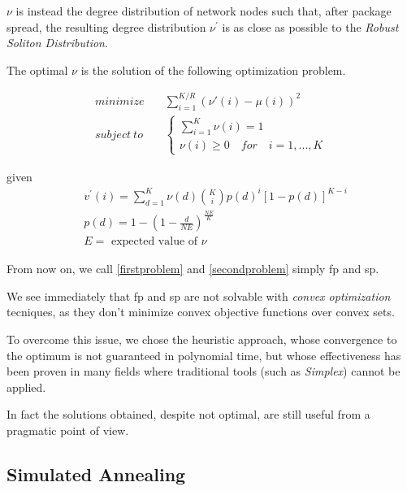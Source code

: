 \documentclass[12pt,journal,draftclsnofoot,onecolumn]{IEEEtran}
\begin{document}
$\nu$ is instead the degree distribution of network nodes such that, after package spread, the resulting degree distribution $\nu^\prime$ is as close as possible to the \emph{Robust Soliton Distribution}.

The optimal $\nu$ is the solution of the following optimization problem\cite{Lin2007}.

\begin{equation}
	\label{secondproblem}
	\begin{split}
		minimize & \quad \sum_{i=1}^{K/R}(\nu'(i)-\mu(i))^2 \\
		subject \ to & \quad \begin{cases}
			\sum_{i=1}^K \nu(i) = 1 \\
			\nu(i) \geq 0 \quad for \quad i=1,...,K
		\end{cases}
	\end{split}
\end{equation}

given
\begin{equation*}
	\begin{split}
		& v^\prime(i) = \sum_{d=1}^K \nu(d) \binom{K}{i} p(d)^i [1-p(d)]^{K-i} \\
		& p(d) = 1 - \left(1 -\frac{d}{N E}\right)^{\frac{N E}{K}} \\
		& E = \text{ expected value of }\nu
	\end{split}
\end{equation*}

From now on, we call \eqref{firstproblem} and \eqref{secondproblem} simply \gls{fp} and \gls{sp}.

We see immediately that \gls{fp} and \gls{sp} are not solvable with \emph{convex optimization} tecniques, as they don't minimize convex objective functions over convex sets.

To overcome this issue, we chose the heuristic approach, whose convergence to the optimum is not guaranteed in polynomial time, but whose effectiveness has been proven in many fields \cite{Edelkamp2010} where traditional tools (such as \emph{Simplex}) cannot be applied.

In fact the solutions obtained, despite not optimal, are still useful from a pragmatic point of view.


\subsection{Simulated Annealing}
\end{document}
